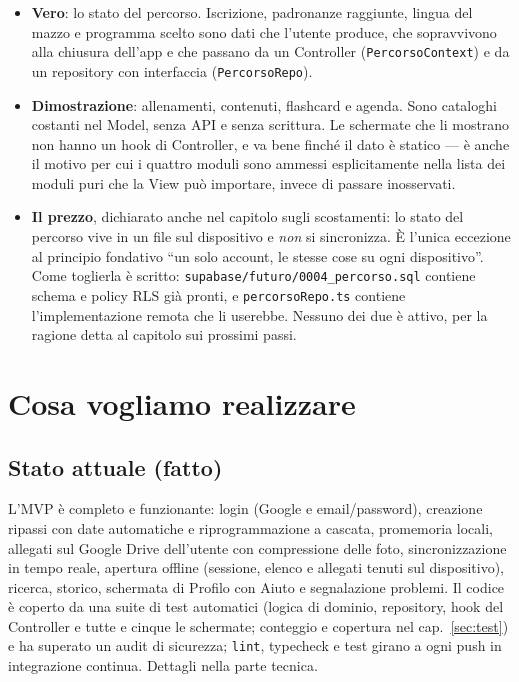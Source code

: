 \documentclass[11pt,a4paper]{report}
\begin{document}
\begin{itemize}[nosep]
  \item \textbf{Vero}: lo stato del percorso. Iscrizione, padronanze raggiunte,
        lingua del mazzo e programma scelto sono dati che l'utente produce, che
        sopravvivono alla chiusura dell'app e che passano da un Controller
        (\texttt{PercorsoContext}) e da un repository con interfaccia
        (\texttt{PercorsoRepo}).
  \item \textbf{Dimostrazione}: allenamenti, contenuti, flashcard e agenda.
        Sono cataloghi costanti nel Model, senza API e senza scrittura. Le
        schermate che li mostrano non hanno un hook di Controller, e va bene
        finch\'e il dato \`e statico --- \`e anche il motivo per cui i quattro
        moduli sono ammessi esplicitamente nella lista dei moduli puri che la
        View pu\`o importare, invece di passare inosservati.
  \item \textbf{Il prezzo}, dichiarato anche nel capitolo sugli scostamenti: lo
        stato del percorso vive in un file sul dispositivo e \emph{non} si
        sincronizza. \`E l'unica eccezione al principio fondativo ``un solo
        account, le stesse cose su ogni dispositivo''. Come toglierla \`e
        scritto: \texttt{supabase/futuro/0004\_percorso.sql} contiene schema e
        policy RLS gi\`a pronti, e \texttt{percorsoRepo.ts} contiene
        l'implementazione remota che li userebbe. Nessuno dei due \`e
        attivo, per la ragione detta al capitolo sui prossimi passi.
\end{itemize}

\chapter{Cosa vogliamo realizzare}

\section{Stato attuale (fatto)}

L'MVP \`e completo e funzionante: login (Google e email/password), creazione
ripassi con date automatiche e riprogrammazione a cascata, promemoria locali,
allegati sul Google Drive dell'utente con compressione delle foto,
sincronizzazione in tempo reale, apertura offline (sessione, elenco e allegati
tenuti sul dispositivo), ricerca, storico, schermata di Profilo con Aiuto e
segnalazione problemi. Il codice \`e coperto da una suite di test automatici
(logica di dominio, repository, hook del Controller e tutte e cinque le
schermate; conteggio e copertura nel cap.~\ref{sec:test}) e ha superato un
audit di sicurezza; \texttt{lint}, typecheck e
test girano a ogni push in integrazione continua. Dettagli nella parte
tecnica.
\end{document}
